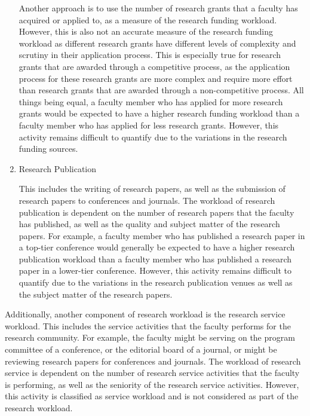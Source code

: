 \begin{enumerate}
            Another approach is to use the number of research grants that a faculty has acquired or applied to, as a measure of the research funding workload. However, this is also not an accurate measure of the research funding workload as different research grants have different levels of complexity and scrutiny in their application process. This is especially true for research grants that are awarded through a competitive process, as the application process for these research grants are more complex and require more effort than research grants that are awarded through a non-competitive process. All things being equal, a faculty member who has applied for more research grants would be expected to have a higher research funding workload than a faculty member who has applied for less research grants. However, this activity remains difficult to quantify due to the variations in the research funding sources.

      \item Research Publication

            This includes the writing of research papers, as well as the submission of research papers to conferences and journals. The workload of research publication is dependent on the number of research papers that the faculty has published, as well as the quality and subject matter of the research papers. For example, a faculty member who has published a research paper in a top-tier conference would generally be expected to have a higher research publication workload than a faculty member who has published a research paper in a lower-tier conference. However, this activity remains difficult to quantify due to the variations in the research publication venues as well as the subject matter of the research papers.

\end{enumerate}

Additionally, another component of research workload is the research service workload. This includes the service activities that the faculty performs for the research community. For example, the faculty might be serving on the program committee of a conference, or the editorial board of a journal, or might be reviewing research papers for conferences and journals. The workload of research service is dependent on the number of research service activities that the faculty is performing, as well as the seniority of the research service activities. However, this activity is classified as service workload and is not considered as part of the research workload.

